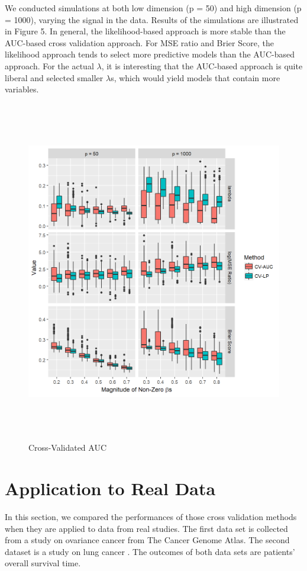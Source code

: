 \par We conducted simulations at both low dimension (p = 50) and high dimension (p = 1000), varying the signal in the data. Results of the simulations are illustrated in Figure 5. In general, the likelihood-based approach is more stable than the AUC-based cross validation approach. For MSE ratio and Brier Score, the likelihood approach tends to select more predictive models than the AUC-based approach. For the actual $\lambda$, it is interesting that the AUC-based approach is quite liberal and selected smaller $\lambda$s, which would yield models that contain more variables. 

\begin{figure}[h]
    \centering
		\includegraphics[height= 15cm ]{./figures/figure_auc.png}
    \caption{Cross-Validated AUC}
\end{figure}	

\section{Application to Real Data}

\par In this section, we compared the performances of those cross validation methods when they are applied to data from real studies. The first data set is collected from a study on ovariance cancer from The Cancer Genome Atlas. The second dataset is a study on lung cancer \citep{shedden2008gene}. The outcomes of both data sets are patients' overall survival time.

